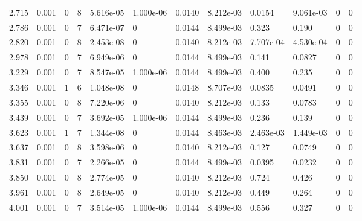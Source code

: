 \documentclass[preview]{standalone}
\begin{document}
{{\begin{tabular}{L{1.2cm}C{1.2cm} C{0.3cm}C{0.5cm} C{1.4cm}C{1.4cm} C{1.4cm}C{1.4cm} C{1.6cm}C{1.6cm} C{1.6cm}C{1.6cm}}
  2.715  &  0.001  & 0     &  8 &  5.616e-05  & 1.000e-06  &  0.0140&   8.212e-03& 0.0154 & 9.061e-03   &  0 & 0  \\ 
  2.786  &  0.001  & 0     &  7 &  6.471e-07  & 0  &  0.0144&   8.499e-03& 0.323 & 0.190   &  0 & 0  \\ 
  2.820  &  0.001  & 0     &  8 &  2.453e-08  & 0  &  0.0140&   8.212e-03& 7.707e-04 & 4.530e-04   &  0 & 0  \\ 
  2.978  &  0.001  & 0     &  7 &  6.949e-06  & 0  &  0.0144&   8.499e-03& 0.141 & 0.0827   &  0 & 0  \\ 
  3.229  &  0.001  & 0     &  7 &  8.547e-05  & 1.000e-06  &  0.0144&   8.499e-03& 0.400 & 0.235   &  0 & 0  \\ 
  3.346  &  0.001  & 1     &  6 &  1.048e-08  & 0  &  0.0148&   8.707e-03& 0.0835 & 0.0491   &  0 & 0  \\ 
  3.355  &  0.001  & 0     &  8 &  7.220e-06  & 0  &  0.0140&   8.212e-03& 0.133 & 0.0783   &  0 & 0  \\ 
  3.439  &  0.001  & 0     &  7 &  3.692e-05  & 1.000e-06  &  0.0144&   8.499e-03& 0.236 & 0.139   &  0 & 0  \\ 
  3.623  &  0.001  & 1     &  7 &  1.344e-08  & 0  &  0.0144&   8.463e-03& 2.463e-03 & 1.449e-03   &  0 & 0  \\ 
  3.637  &  0.001  & 0     &  8 &  3.598e-06  & 0  &  0.0140&   8.212e-03& 0.127 & 0.0749   &  0 & 0  \\ 
  3.831  &  0.001  & 0     &  7 &  2.266e-05  & 0  &  0.0144&   8.499e-03& 0.0395 & 0.0232   &  0 & 0  \\ 
  3.850  &  0.001  & 0     &  8 &  2.774e-05  & 0  &  0.0140&   8.212e-03& 0.724 & 0.426   &  0 & 0  \\ 
  3.961  &  0.001  & 0     &  8 &  2.649e-05  & 0  &  0.0140&   8.212e-03& 0.449 & 0.264   &  0 & 0  \\ 
  4.001  &  0.001  & 0     &  7 &  3.514e-05  & 1.000e-06  &  0.0144&   8.499e-03& 0.556 & 0.327   &  0 & 0  \\ 
\hline 
\end{tabular} 

}}
\end{document}
